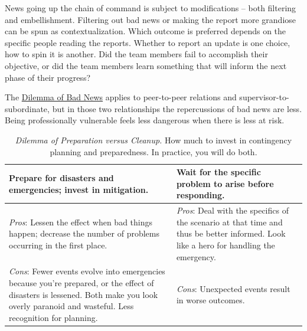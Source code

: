 News going up the chain of command is subject to modifications -- both filtering and embellishment. Filtering out bad news or making the report more grandiose can be spun as contextualization. Which outcome is preferred depends on the specific people reading the reports. Whether to report an update is one choice, how to spin it is another. Did the team members fail to accomplish their objective, or did the team members learn something that will inform the next phase of their progress?


The \hyperref[table:dilemma-personal-bad-news-up-the-chain]{Dilemma of Bad News} applies to peer-to-peer relations and supervisor-to-subordinate, but in those two relationships the repercussions of bad news are less. Being professionally vulnerable feels less dangerous when there is less at risk. 


\begin{center}
\begin{table}[H] %
\begin{tabular}{ | m{\dilemmatablewidth}| m{\dilemmatablewidth} | } 
  \hline
  \textbf{Prepare for disasters and emergencies; invest in mitigation.} &
  \textbf{Wait for the specific problem to arise before responding.} \\
  \hline
  \textit{Pros}: Lessen the effect when bad things happen; decrease the number of problems  occurring in the first place. &
  \textit{Pros}: Deal with the specifics of the scenario at that time and thus be better informed. Look like a hero for handling the emergency. \\
  \hline
  \textit{Cons}: Fewer events evolve into emergencies because you're prepared, or the effect of disasters is lessened. Both make you look overly paranoid and wasteful. Less recognition for planning. & 
  \textit{Cons}: Unexpected events result in worse outcomes.  \\
  \hline
\end{tabular}
\caption{
\textit{Dilemma of Preparation versus Cleanup.} 
How much to invest in contingency planning and preparedness. In practice, you will do both.}
\label{table:dilemma-personal-emergencies-vs-ignore}
\end{table}
\end{center}

